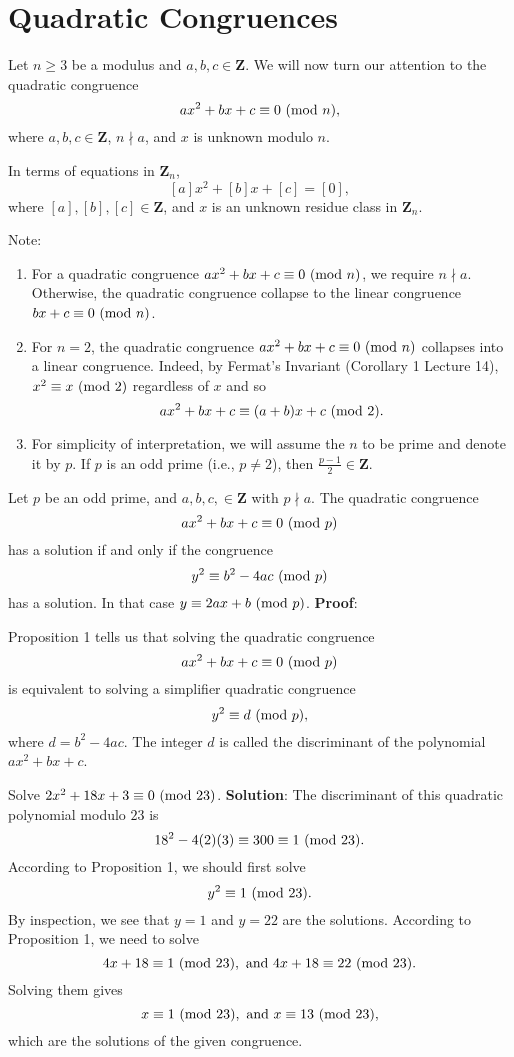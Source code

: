 

\section{Quadratic Congruences}
Let $ n\ge 3 $ be a modulus and $ a,b,c\in\mathbf{Z} $. We will now turn our attention
to the quadratic congruence
\[ ax^2+bx+c\equiv 0\ (\mathrm{mod}\ n), \]
where $ a,b,c\in\mathbf{Z} $, $ n\nmid a $, and $ x $ is unknown modulo $ n $.

In terms of equations in $ \mathbf{Z}_n $,
\[ [a]x^2+[b]x+[c]=[0], \]
where $ [a],[b],[c]\in\mathbf{Z} $, and $ x $ is an unknown residue class in $ \mathbf{Z}_n $.

Note:
\begin{enumerate}[(1)]
    \item For a quadratic congruence $ ax^2+bx+c\equiv 0\ (\mathrm{mod}\ n) $, we require $ n\nmid a $. Otherwise,
          the quadratic congruence collapse to the linear congruence $ bx+c\equiv 0\ (\mathrm{mod}\ n) $.
    \item For $ n=2 $, the quadratic congruence $ ax^2+bx+c\equiv 0\ (\mathrm{mod}\ n) $ collapses into a linear
          congruence. Indeed, by Fermat's Invariant (Corollary 1 Lecture 14), $ x^2\equiv x\ (\mathrm{mod}\ 2) $
          regardless of $ x $ and so
          \[ ax^2+bx+c\equiv (a+b)x+c\ (\mathrm{mod}\ 2). \]
    \item For simplicity of interpretation, we will assume the $ n $ to be prime and
          denote it by $ p $. If $ p $ is an odd prime (i.e., $ p\ne 2 $), then $ \frac{p-1}{2}\in\mathbf{Z} $.
\end{enumerate}
\begin{Proposition}{}{}
    Let $ p $ be an odd prime, and $ a,b,c,\in\mathbf{Z} $ with $ p\nmid a $. The quadratic congruence
    \[ ax^2+bx+c\equiv 0\ (\mathrm{mod}\ p) \]
    has a solution if and only if the congruence
    \[ y^2\equiv b^2-4ac\ (\mathrm{mod}\ p) \]
    has a solution. In that case $ y\equiv 2ax+b\ (\mathrm{mod}\ p) $.
    \tcblower{}
    \textbf{Proof}:
\end{Proposition}
Proposition 1 tells us that solving the quadratic congruence
\[ ax^2+bx+c\equiv 0\ (\mathrm{mod}\ p) \]
is equivalent to solving a simplifier quadratic congruence
\[ y^2\equiv d\ (\mathrm{mod}\ p), \]
where $ d=b^2-4ac $. The integer $ d $ is called the discriminant of the polynomial
$ ax^2+bx+c $.
\begin{Example}{}{}
    Solve $ 2x^2+18x+3\equiv 0\ (\mathrm{mod}\ 23) $.
    \tcblower{}
    \textbf{Solution}: The discriminant of this quadratic polynomial modulo $ 23 $ is
    \[ 18^2-4(2)(3)\equiv 300\equiv 1\ (\mathrm{mod}\ 23). \]
    According to Proposition 1, we should first solve
    \[ y^2\equiv 1\ (\mathrm{mod}\ 23). \]
    By inspection, we see that $ y=1 $ and $ y=22 $ are the solutions. According to Proposition 1, we need to solve
    \[ 4x+18\equiv 1\ (\mathrm{mod}\ 23),\text{ and }4x+18\equiv 22\ (\mathrm{mod}\ 23). \]
    Solving them gives
    \[ x\equiv 1\ (\mathrm{mod}\ 23),\text{ and }x\equiv 13\ (\mathrm{mod}\ 23), \]
    which are the solutions of the given congruence.
\end{Example}
